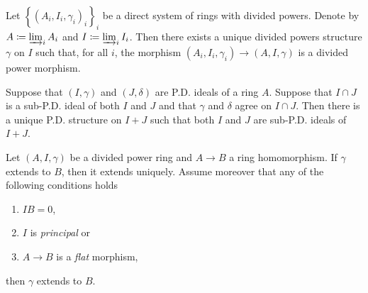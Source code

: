 \begin{lem}
	Let \(\left\{ \left(A_i, I_i, \gamma_i\right)_{ i } \right\}_{ i }\)
	be a direct system of rings with divided powers.
	Denote by \(A \coloneqq \varinjlim_{ i } A_i\)
	and \(I \coloneqq \varinjlim_{ i } I_i\).
	Then there exists a unique divided powers structure \(\gamma\) on \(I\)
	such that, for all \(i\), the morphism
	\(\left(A_i, I_i, \gamma_i\right) \to \left(A, I, \gamma\right)\)
	is a divided power morphism.
\end{lem}




\begin{prop}\label{lem:PDExt2}
	Suppose that $\left(I, \gamma\right)$ and $\left(J, \delta\right)$ are
	P.D. ideals of a ring $A$.
	Suppose that $I \cap J$ is a sub-P.D. ideal of both
	$I$ and $J$ and that $\gamma$ and $\delta$ agree on
	$I \cap J$.
	Then there is a unique P.D. structure on $I+J$
	such that both $I$ and $J$ are sub-P.D. ideals of $I+J$.
\end{prop}


\newpage
\begin{lem}
\label{lem:PDFlatExtension}
	Let $\left(A, I, \gamma\right)$ be a divided power ring
	and $A \to B$ a ring homomorphism.
	If $\gamma$ extends to $B$, then it extends uniquely.
	Assume moreover that any of the following conditions holds
\begin{enumerate}
	\item $IB = 0$,
	\item $I$ is \emph{principal} or
	\item $A \to B$ is a \emph{flat} morphism,
\end{enumerate}
	then $\gamma$ extends to $B$.
\end{lem} 


